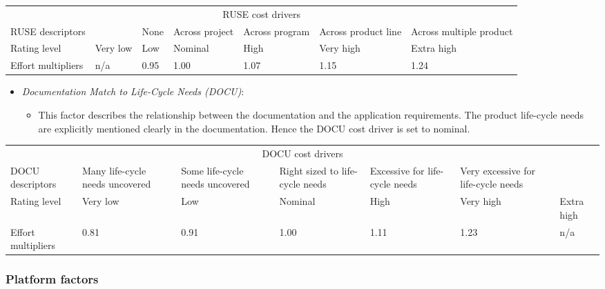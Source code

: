 \begin{table}[H]
	\hspace*{-1.7cm}
	\begin{tabular}{|p{2cm}|p{2cm}|p{2cm}|p{2cm}|p{2cm}|p{2cm}|p{2cm}|}
		\hline
		\multicolumn{7}{|c|}{RUSE cost drivers} \\
		\hhline{|=======|}
		RUSE descriptors & & None & Across project & Across program & Across product line & Across multiple product \\
		\hline
		Rating level & Very low & Low & Nominal & High & Very high & Extra high \\
		\hline
		Effort multipliers & n/a & 0.95 & 1.00 & 1.07 & 1.15 & 1.24 \\
		\hline
	\end{tabular}
\end{table}

\begin{itemize}
	\item \emph{Documentation Match to Life-Cycle Needs (DOCU)}:
	\begin{itemize}
		\item[] This factor describes the relationship between the documentation and the application requirements. The product life-cycle needs are explicitly mentioned clearly in the documentation. Hence the DOCU cost driver is set to nominal.
	\end{itemize}
\end{itemize}

\begin{table}[H]
	\hspace*{-1.7cm}
	\begin{tabular}{|p{2cm}|p{2cm}|p{2cm}|p{2cm}|p{2cm}|p{2cm}|p{2cm}|}
		\hline
		\multicolumn{7}{|c|}{DOCU cost drivers} \\
		\hhline{|=======|}
		DOCU descriptors & Many life-cycle needs uncovered & Some life-cycle needs uncovered & Right sized to life-cycle needs & Excessive for life-cycle needs & Very excessive for life-cycle needs & \\
		\hline
		Rating level & Very low & Low & Nominal & High & Very high & Extra high \\
		\hline
		Effort multipliers & 0.81 & 0.91 & 1.00 & 1.11 & 1.23 & n/a \\
		\hline
	\end{tabular}
\end{table}

\subsubsection{Platform factors}

